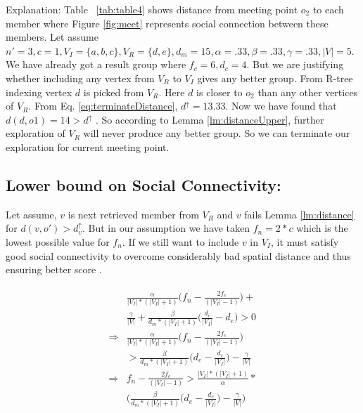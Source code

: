 \documentclass{vldb}
\begin{document}
				
		{Explanation:} Table ~\ref{tab:table4} shows distance from meeting point $ o_{2} $ to each member where Figure \ref{fig:meet} represents social connection between these members. Let assume $ n'=3,c=1, V_I=\{a,b,c\}, V_R=\{d,e\} ,d_{m}=15, \alpha=.33, \beta=.33, \gamma =.33,|V|=5$. We have already got a result group where $ f_{c}=6 , d_{c} =4 $. But we are justifying whether including any vertex from $ V_R $ to $ V_I $ gives any better group. From R-tree indexing vertex $ d  $ is picked from $ V_R $. Here $ d $ is closer to $ o_{2} $ than any other vertices of $ V_R $. From Eq. \eqref{eq:terminateDistance}, $ d^\uparrow=13.33 $. Now we have found that $ d(d,o1)=14 > d^\uparrow $ . So according to Lemma \ref{lm:distanceUpper}, further exploration of $ V_R $ will never produce any better group. So we can terminate our exploration for current meeting point.
		
		
		\subsection{Lower bound on Social Connectivity:}
		 Let assume, $ v $ is next retrieved member from $ V_R $ and $ v $ fails Lemma \ref{lm:distance} for $ d(v,o')>d_v^\uparrow $. But in our assumption we have taken $ f_{n}=2*c $ which is the lowest possible value for $ f_{n} $. If we still want to include $ v  $ in $ V_I $, it must satisfy good social connectivity to overcome considerably bad spatial distance and thus ensuring better score . 	 
		 
			\[
			\begin{aligned}
			\begin{split}
			&\frac{\alpha}{|V_I|*(|V_I|+1)}\bigg(f_n-\frac{2f_c}{(|V_I|-1)}
							\bigg)+
					\\
					& \frac{\gamma}{|V|}+
					\frac{\beta}{d_m*(|V_I|+1)}\bigg(\frac{d_c}{|V_I|}-d_e\bigg) > 0
			\\
			\Rightarrow
			&	\frac{\alpha}{|V_I|*(|V_I|+1)}\bigg(f_n-\frac{2f_c}{(|V_I|-1)}
									\bigg)
			\\
			&>
			\frac{\beta}{d_m*(|V_I|+1)}\bigg(d_e-\frac{d_c}{|V_I|}\bigg)-\frac{\gamma}{|V|}  	
			\\
			\Rightarrow
			&	f_n-\frac{2f_c}{(|V_I|-1)} >
			\frac{|V_I|*(|V_I|+1)}{\alpha}*
			\\
			&\Bigg(\frac{\beta}{d_m*(|V_I|+1)}\bigg(d_e-\frac{d_c}{|V_I|}\bigg)-\frac{\gamma}{|V|}\Bigg)
			\end{split}
			\end{aligned}
			\]
		
\end{document}
